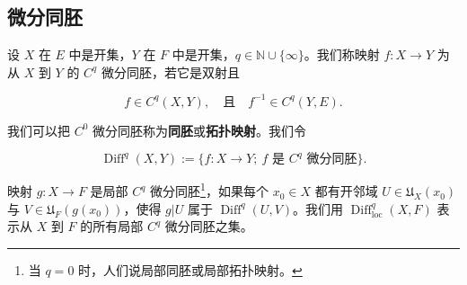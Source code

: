 \subsection*{微分同胚}

设 $ X $ 在 $ E $ 中是开集，$ Y $ 在 $ F $ 中是开集，$ q \in \mathbb{N} \cup \{\infty\} $。我们称映射 $ f : X \to Y $ 为从 $ X $ 到 $ Y $ 的 $ C^{q} $ 微分同胚，若它是双射且

\[
f \in C^{q}(X, Y) , \quad \text{且} \quad f^{-1} \in C^{q}(Y, E) .
\]

我们可以把 $ C^{0} $ 微分同胚称为\textbf{同胚}或\textbf{拓扑映射}。我们令

\[
\operatorname{Diff}^{q}(X, Y) := \{f : X \to Y ; \ f \text{ 是 } C^{q} \text{ 微分同胚}\} .
\]

映射 $ g : X \to F $ 是局部 $ C^{q} $ 微分同胚\footnote{当 $ q = 0 $ 时，人们说局部同胚或局部拓扑映射。}，如果每个 $ x_{0} \in X $ 都有开邻域 $ U \in \mathfrak{U}_{X}(x_{0}) $ 与 $ V \in \mathfrak{U}_{F}(g(x_{0})) $，使得 $ g|U $ 属于 $ \operatorname{Diff}^{q}(U, V) $。我们用 $ \operatorname{Diff}_{\mathrm{loc}}^{q}(X, F) $ 表示从 $ X $ 到 $ F $ 的所有局部 $ C^{q} $ 微分同胚之集。

